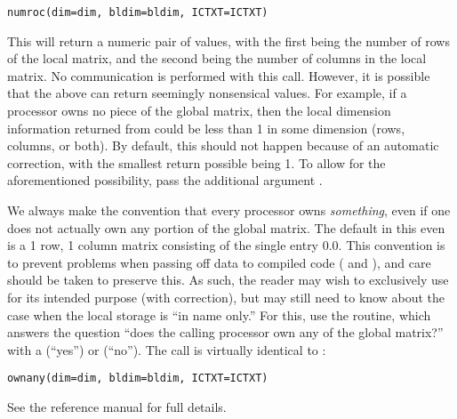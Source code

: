 \begin{lstlisting}[language=rr]
numroc(dim=dim, bldim=bldim, ICTXT=ICTXT)
\end{lstlisting}

This will return a numeric pair of values, with the first being the number of rows of the local matrix, and the second being the number of columns in the local matrix.  No communication is performed with this call.  However, it is possible that the above can return seemingly nonsensical values.  For example, if a processor owns no piece of the global matrix, then the local dimension information returned from  could be less than 1 in some dimension (rows, columns, or both).  By default, this should not happen because of an automatic correction, with the smallest return possible being 1.  To allow for the aforementioned possibility, pass the additional argument .

We always make the convention that every processor owns \emph{something}, even if one does not actually own any portion of the global matrix.  The default in this even is a 1 row, 1 column matrix consisting of the single entry $0.0$.  This convention is to prevent problems when passing off data to compiled code ( and ), and care should be taken to preserve this.  As such, the reader may wish to exclusively use  for its intended purpose (with correction), but may still need to know about the case when the local storage is ``in name only.''  For this, use the  routine, which answers the question ``does the calling processor own any of the global matrix?'' with a  (``yes'') or  (``no'').  The call is virtually identical to :

\begin{lstlisting}[language=rr]
ownany(dim=dim, bldim=bldim, ICTXT=ICTXT)
\end{lstlisting}

See the  reference manual for full details.